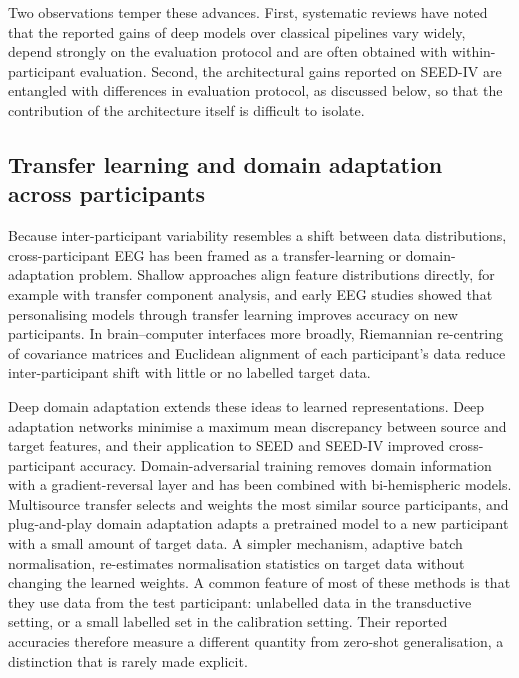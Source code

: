 Two observations temper these advances. First, systematic reviews have noted that the reported gains of deep models over classical pipelines vary widely, depend strongly on the evaluation protocol and are often obtained with within-participant evaluation\cite{craik,roy}. Second, the architectural gains reported on SEED-IV are entangled with differences in evaluation protocol, as discussed below, so that the contribution of the architecture itself is difficult to isolate.


\subsection{Transfer learning and domain adaptation across participants}
Because inter-participant variability resembles a shift between data distributions, cross-participant EEG has been framed as a transfer-learning or domain-adaptation problem\cite{jayaram,wu}. Shallow approaches align feature distributions directly, for example with transfer component analysis\cite{pan}, and early EEG studies showed that personalising models through transfer learning improves accuracy on new participants\cite{zhengpers}. In brain–computer interfaces more broadly, Riemannian re-centring of covariance matrices\cite{zanini} and Euclidean alignment of each participant’s data\cite{he} reduce inter-participant shift with little or no labelled target data.

Deep domain adaptation extends these ideas to learned representations. Deep adaptation networks minimise a maximum mean discrepancy between source and target features\cite{long}, and their application to SEED and SEED-IV improved cross-participant accuracy\cite{dan}. Domain-adversarial training removes domain information with a gradient-reversal layer\cite{ganin} and has been combined with bi-hemispheric models\cite{bidann,bihdm}. Multisource transfer selects and weights the most similar source participants\cite{multisource}, and plug-and-play domain adaptation adapts a pretrained model to a new participant with a small amount of target data\cite{plugplay}. A simpler mechanism, adaptive batch normalisation, re-estimates normalisation statistics on target data without changing the learned weights\cite{adabn}. A common feature of most of these methods is that they use data from the test participant: unlabelled data in the transductive setting, or a small labelled set in the calibration setting. Their reported accuracies therefore measure a different quantity from zero-shot generalisation, a distinction that is rarely made explicit.



